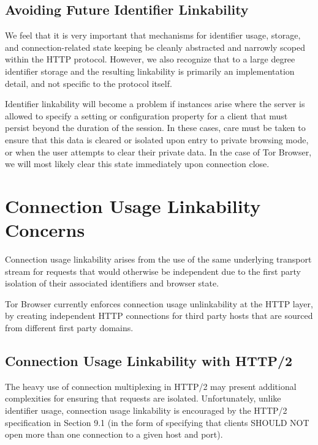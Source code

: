 \documentclass[letterpaper,11pt]{llncs}
\begin{document}
\subsection{Avoiding Future Identifier Linkability}

We feel that it is very important that mechanisms for identifier usage,
storage, and connection-related state keeping be cleanly abstracted and
narrowly scoped within the HTTP protocol. However, we also recognize that to a
large degree identifier storage and the resulting linkability is primarily an
implementation detail, and not specific to the protocol itself.

Identifier linkability will become a problem if instances arise where the
server is allowed to specify a setting or configuration property for a client
that must persist beyond the duration of the session. In these cases, care
must be taken to ensure that this data is cleared or isolated upon entry to
private browsing mode, or when the user attempts to clear their private data.
In the case of Tor Browser, we will most likely clear this state immediately
upon connection close.

\section{Connection Usage Linkability Concerns}

Connection usage linkability arises from the use of the same underlying
transport stream for requests that would otherwise be independent due to the
first party isolation of their associated identifiers and browser state.

Tor Browser currently enforces connection usage unlinkability at the HTTP
layer, by creating independent HTTP connections for third party hosts that
are sourced from different first party domains.

\subsection{Connection Usage Linkability with HTTP/2}

The heavy use of connection multiplexing in HTTP/2 may present additional
complexities for ensuring that requests are isolated. Unfortunately, unlike
identifier usage, connection usage linkability is encouraged by the
HTTP/2 specification in Section 9.1 (in the form of specifying that clients
SHOULD NOT open more than one connection to a given host and
port)\cite{http2-spec}.
\end{document}
